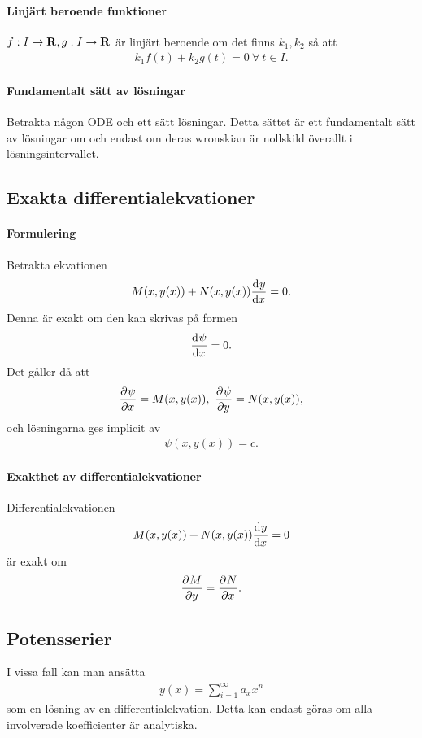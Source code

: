 \paragraph{Linjärt beroende funktioner}
$f: I\to\mathbf{R}, g: I\to\mathbf{R}$ är linjärt beroende om det finns $k_{1}, k_{2}$ så att
\begin{align*}
	k_{1}f(t) + k_{2}g(t) = 0\ \forall\ t\in I.
\end{align*}

\paragraph{Fundamentalt sätt av lösningar}
Betrakta någon ODE och ett sätt lösningar. Detta sättet är ett fundamentalt sätt av lösningar om och endast om deras wronskian är nollskild överallt i lösningsintervallet.







\subsection{Exakta differentialekvationer}

\paragraph{Formulering}
Betrakta ekvationen
\begin{align*}
	M(x, y(x)) + N(x, y(x))\dv[]{y}{x} (x) = 0.
\end{align*}
Denna är exakt om den kan skrivas på formen
\begin{align*}
	\dv[]{\psi}{x} (x, y(x)) = 0.
\end{align*}
Det gåller då att
\begin{align*}
	\pdv[]{\psi}{x} (x, y(x)) = M(x, y(x)),\ \pdv[]{\psi}{y} (x, y(x)) = N(x, y(x)),
\end{align*}
och lösningarna ges implicit av
\begin{align*}
	\psi(x, y(x)) = c.
\end{align*}

\paragraph{Exakthet av differentialekvationer}
Differentialekvationen
\begin{align*}
	M(x, y(x)) + N(x, y(x))\dv[]{y}{x} (x) = 0
\end{align*}
är exakt om
\begin{align*}
	\pdv[]{M}{y} (x, y(x)) = \pdv[]{N}{x} (x, y(x)).
\end{align*}

\subsection{Potensserier}
I vissa fall kan man ansätta
\begin{align*}
	y(x) = \sum\limits_{i = 1}^{\infty}a_{x}x^{n}
\end{align*}
som en lösning av en differentialekvation. Detta kan endast göras om alla involverade koefficienter är analytiska.

